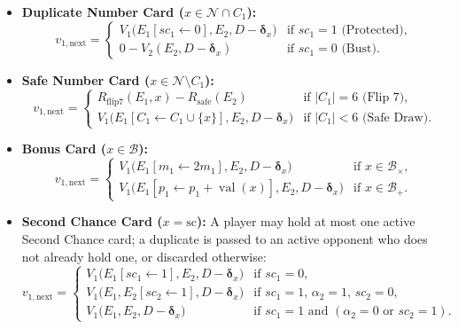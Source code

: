 \documentclass{article}
\theoremstyle{plain}
\theoremstyle{definition}
\theoremstyle{remark}
\DeclareMathOperator{\val}{val}
\begin{document}
\begin{itemize}
    \item \textbf{Duplicate Number Card ($x \in \mathcal{N} \cap C_1$):}
    \[
        v_{1,\text{next}} =
        \begin{cases}
            V_1\big(E_1[sc_1 \leftarrow 0], E_2, D - \boldsymbol{\delta}_x\big) & \text{if } sc_1 = 1 \text{ (Protected)}, \\
            0 - V_2(E_2, D - \boldsymbol{\delta}_x) & \text{if } sc_1 = 0 \text{ (Bust)}.
        \end{cases}
    \]

    \item \textbf{Safe Number Card ($x \in \mathcal{N} \setminus C_1$):}
    \[
        v_{1,\text{next}} =
        \begin{cases}
            R_{\text{flip7}}(E_1, x) - R_{\text{safe}}(E_2) & \text{if } |C_1| = 6 \text{ (Flip 7)}, \\
            V_1\big(E_1[C_1 \leftarrow C_1 \cup \{x\}], E_2, D - \boldsymbol{\delta}_x\big) & \text{if } |C_1| < 6 \text{ (Safe Draw)}.
        \end{cases}
    \]

    \item \textbf{Bonus Card ($x \in \mathcal{B}$):}
    \[
        v_{1,\text{next}} =
        \begin{cases}
            V_1\big(E_1[m_1 \leftarrow 2m_1], E_2, D - \boldsymbol{\delta}_x\big) & \text{if } x \in \mathcal{B}_{\times}, \\
            V_1\big(E_1[p_1 \leftarrow p_1 + \val(x)], E_2, D - \boldsymbol{\delta}_x\big) & \text{if } x \in \mathcal{B}_{+}.
        \end{cases}
    \]

    \item \textbf{Second Chance Card ($x = \text{sc}$):} A player may hold at most one active Second Chance card; a duplicate is passed to an active opponent who does not already hold one, or discarded otherwise:
    \[
        v_{1,\text{next}} =
        \begin{cases}
            V_1\big(E_1[sc_1 \leftarrow 1], E_2, D - \boldsymbol{\delta}_x\big) & \text{if } sc_1 = 0, \\
            V_1\big(E_1, E_2[sc_2 \leftarrow 1], D - \boldsymbol{\delta}_x\big) & \text{if } sc_1 = 1,\, \alpha_2 = 1,\, sc_2 = 0, \\
            V_1\big(E_1, E_2, D - \boldsymbol{\delta}_x\big) & \text{if } sc_1 = 1 \text{ and } (\alpha_2 = 0 \text{ or } sc_2 = 1).
        \end{cases}
    \]


\end{itemize}
\end{document}
